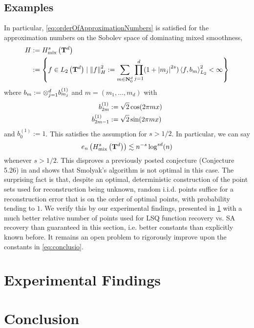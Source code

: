 \documentclass[12pt, oneside]{amsart}
\theoremstyle{definition}
\theoremstyle{remark}
\numberwithin{equation}{section}
\begin{document}
\subsection*{Examples}
In particular, \ref{eq:orderOfApproximationNumbers} is satisfied for the approximation numbers on the Sobolev space of dominating mixed smoothness, \begin{align*}
    H &\defn H_{\text{mix}}^s\left(\T^d\right)\\
    &\defn \set{f \in L_2\left(\T^d\right) \mid \norm[H]{f}^2 \defn \sum_{m \in \N_0^d} \prod_{j=1}^d (1+\abs{m_j}^{2s}) \inner{f}{b_m}^2_{L_2} < \infty}
\end{align*}
where \(b_m \defn \otimes_{j=1}^d b_{m_j}^{(1)}\) and \(m = (m_1, \dots, m_d)\) with \begin{align*}
    b_{2m}^{(1)} &\defn \sqrt{2}\cos(2\pi m x)\\
    b_{2m-1}^{(1)} &\defn \sqrt{2}\sin(2\pi m x)
\end{align*}
and \(b_0^{(1)} := 1\). This satisfies the assumption for \(s > 1/2\). In particular, we can say
\begin{equation}\label{eq:conclusio}
    e_n\left( H_{\text{mix}}^s\left(\T^d\right) \right) \lesssim n^{-s}\log^{sd}(n)
\end{equation}
whenever \(s > 1/2\). This disproves a previously posted conjecture (Conjecture 5.26) in \cite{Dung_Temlyakov_Ullrich_2018} and shows that Smolyak's algorithm is not optimal in this case. The surprising fact is that, despite an optimal, deterministic construction of the point sets used for reconstruction being unknown, random i.i.d. points suffice for a reconstruction error that is on the order of optimal points, with probability tending to \(1\). We verify this by our experimental findings, presented in \ref{sec:experimentalFindings} with a much better relative number of points used for LSQ function recovery vs. SA recovery than guaranteed in this section, i.e. better constants than explicitly known before. It remains an open problem to rigorously improve upon the constants in \ref{eq:conclusio}.

\section{Experimental Findings}\label{sec:experimentalFindings}


\section{Conclusion}


\newpage

\nocite{*}
\printbibliography
\end{document}
